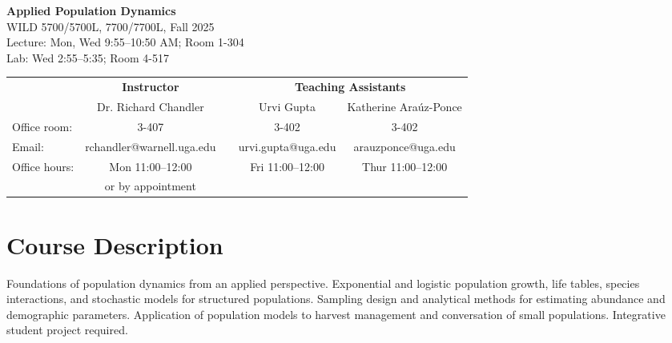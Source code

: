 \documentclass[12pt]{article}
\begin{document}

{\centering

{\Large
  \bf \sc
  Applied Population Dynamics \\}
  WILD 5700/5700L, 7700/7700L, Fall 2025  \\
  Lecture: Mon, Wed 9:55--10:50 AM; Room 1-304 \\
  Lab: Wed 2:55--5:35; Room 4-517 \\

\normalsize

\vspace{0.5cm}

{\small
\begin{tabular}[h!]{lcccc}
              & \textbf{Instructor}       & \hspace{0.01cm} & \multicolumn{2}{c}{\textbf{Teaching Assistants}} \\
              & Dr. Richard Chandler      &                 & Urvi Gupta         & Katherine Ara\'uz-Ponce     \\
Office room:  & 3-407                     &                 & 3-402              & 3-402                       \\
Email:        & rchandler@warnell.uga.edu &                 & urvi.gupta@uga.edu & arauzponce@uga.edu          \\
Office hours: & Mon 11:00--12:00          &                 & Fri 11:00--12:00   & Thur 11:00--12:00           \\
              & or by appointment         &                 &                    &                             \\
\end{tabular}
}

}



\normalsize


\vspace{-3mm}
\section*{\normalsize Course Description}
\vspace{-4mm}
Foundations of population dynamics from an applied
perspective. Exponential and logistic population growth, life tables,
species interactions, and stochastic models for structured
populations. Sampling design and analytical methods for estimating
abundance and demographic parameters. Application of population models
to harvest management and conversation of small
populations. Integrative student project required. 
\end{document}
